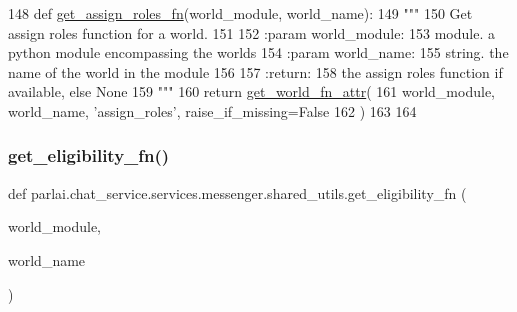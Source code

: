 \begin{DoxyCode}
148 \textcolor{keyword}{def }\hyperlink{namespaceparlai_1_1chat__service_1_1services_1_1messenger_1_1shared__utils_a1cf883c977b3fcd06db0d998ae976871}{get\_assign\_roles\_fn}(world\_module, world\_name):
149     \textcolor{stringliteral}{"""}
150 \textcolor{stringliteral}{    Get assign roles function for a world.}
151 \textcolor{stringliteral}{}
152 \textcolor{stringliteral}{    :param world\_module:}
153 \textcolor{stringliteral}{        module. a python module encompassing the worlds}
154 \textcolor{stringliteral}{    :param world\_name:}
155 \textcolor{stringliteral}{        string. the name of the world in the module}
156 \textcolor{stringliteral}{}
157 \textcolor{stringliteral}{    :return:}
158 \textcolor{stringliteral}{        the assign roles function if available, else None}
159 \textcolor{stringliteral}{    """}
160     \textcolor{keywordflow}{return} \hyperlink{namespaceparlai_1_1chat__service_1_1services_1_1messenger_1_1shared__utils_ade421ab07be47db0333a0fac599c07ef}{get\_world\_fn\_attr}(
161         world\_module, world\_name, \textcolor{stringliteral}{'assign\_roles'}, raise\_if\_missing=\textcolor{keyword}{False}
162     )
163 
164 
\end{DoxyCode}
\mbox{\label{namespaceparlai_1_1chat__service_1_1services_1_1messenger_1_1shared__utils_a3099521db089497f3e8c976a98dff7b9}} 
\subsubsection{\texorpdfstring{get\+\_\+eligibility\+\_\+fn()}{get\_eligibility\_fn()}}
{\footnotesize\ttfamily def parlai.\+chat\+\_\+service.\+services.\+messenger.\+shared\+\_\+utils.\+get\+\_\+eligibility\+\_\+fn (\begin{DoxyParamCaption}\item[{}]{world\+\_\+module,  }\item[{}]{world\+\_\+name }\end{DoxyParamCaption})}

